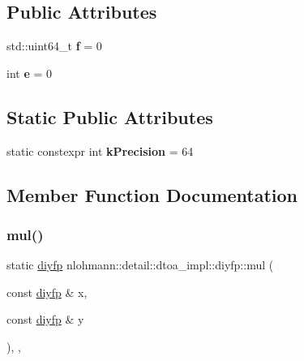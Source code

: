\subsection*{Public Attributes}
\begin{DoxyCompactItemize}
\item 
\mbox{\label{structnlohmann_1_1detail_1_1dtoa__impl_1_1diyfp_aea90459e340a231ca31d46946803ef51}} 
std\+::uint64\+\_\+t {\bfseries f} = 0
\item 
\mbox{\label{structnlohmann_1_1detail_1_1dtoa__impl_1_1diyfp_ae22e170815983961447c429f324c944d}} 
int {\bfseries e} = 0
\end{DoxyCompactItemize}
\subsection*{Static Public Attributes}
\begin{DoxyCompactItemize}
\item 
\mbox{\label{structnlohmann_1_1detail_1_1dtoa__impl_1_1diyfp_a03682754b06ed4f30b263119eecc2d52}} 
static constexpr int {\bfseries k\+Precision} = 64
\end{DoxyCompactItemize}


\subsection{Member Function Documentation}
\mbox{\label{structnlohmann_1_1detail_1_1dtoa__impl_1_1diyfp_aa5f250d12ce89c81fdb08900c6a823e8}} 
\subsubsection{\texorpdfstring{mul()}{mul()}}
{\footnotesize\ttfamily static \mbox{\hyperlink{structnlohmann_1_1detail_1_1dtoa__impl_1_1diyfp}{diyfp}} nlohmann\+::detail\+::dtoa\+\_\+impl\+::diyfp\+::mul (\begin{DoxyParamCaption}\item[{const \mbox{\hyperlink{structnlohmann_1_1detail_1_1dtoa__impl_1_1diyfp}{diyfp}} \&}]{x,  }\item[{const \mbox{\hyperlink{structnlohmann_1_1detail_1_1dtoa__impl_1_1diyfp}{diyfp}} \&}]{y }\end{DoxyParamCaption})\hspace{0.3cm}{\ttfamily [inline]}, {\ttfamily [static]}, {\ttfamily [noexcept]}}



